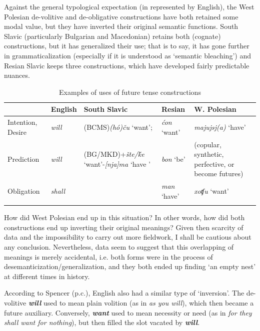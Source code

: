 \documentclass[output=paper,colorlinks,citecolor=brown]{langscibook}
\begin{document}
Against the general typological expectation (in  represented by English), the West Polesian de-volitive and de-obligative constructions have both retained some modal value, but they have inverted their original semantic functions. South Slavic (particularly Bulgarian and Macedonian) retains both (cognate) constructions, but it has generalized their use; that is to say, it has gone further in grammaticalization (especially if it is understood as ‘semantic bleaching’) and Resian Slavic keeps three constructions, which have developed fairly predictable nuances.



\begin{table}
\centering
\begin{tabularx}{\textwidth}{QQp{2.3cm}QQ} %
\lsptoprule
                    & {English}     & {South Slavic} & {Resian}            & {W. Polesian} \\
  \midrule
  Intention, Desire & \textit{will} & (BCMS)\newline \textit{(hó)ču} ‘want’;  & \textit{ćon} ‘want’ & \textit{majujsj(a)} ‘have’\\
 
  Prediction        & \textit{will} & (BG/MKD)\newline +\textit{šte/ḱe} ‘want’\newline -\textit{[nja]ma} ‘have \newline [not]’ & \textit{bon} ‘be’   & (copular, synthetic, perfective, or become futures)\\
 
  Obligation        & \textit{shall}&                & \textit{man} ‘have’ & \textit{xoʧu} ‘want’\\
  \lspbottomrule
\end{tabularx}
\caption{Examples of uses of future tense constructions}
\label{tab:roncero:1}
\end{table}


How did West Polesian end up in this situation? In other words, how did both constructions end up inverting their original meanings? Given then scarcity of data and the impossibility to carry out more fieldwork, I shall be cautious about any conclusion. Nevertheless, data seem to suggest that this overlapping of meanings is merely accidental, i.e. both forms were in the process of desemanticization/generalization, and they both ended up finding ‘an empty nest’ at different times in history. 

According to Spencer (p.c.), English also had a similar type of ‘inversion’. The de-volitive \textbf{\textit{will}} used to mean plain volition (as in \textit{as you will}), which then became a future auxiliary. Conversely, \textbf{\textit{want}} used to mean necessity or need (as in \textit{for they shall want for nothing}), but then filled the slot vacated by \textbf{\textit{will}}.
\end{document}
